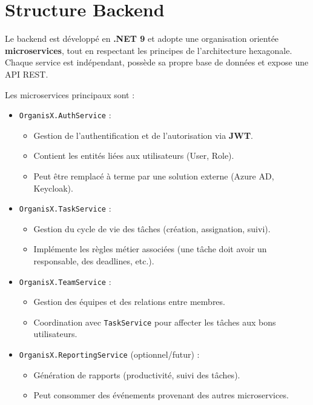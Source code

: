 \newpage
\section{Structure Backend}
Le backend est développé en \textbf{.NET 9} et adopte une organisation orientée \textbf{microservices}, tout en respectant les principes de l’architecture hexagonale.  
Chaque service est indépendant, possède sa propre base de données et expose une API REST.  

Les microservices principaux sont :  
\begin{itemize}
	\item \texttt{OrganisX.AuthService} :
	\begin{itemize}
		\item Gestion de l’authentification et de l’autorisation via \textbf{JWT}.
		\item Contient les entités liées aux utilisateurs (User, Role).
		\item Peut être remplacé à terme par une solution externe (Azure AD, Keycloak).
	\end{itemize}
	
	\item \texttt{OrganisX.TaskService} :
	\begin{itemize}
		\item Gestion du cycle de vie des tâches (création, assignation, suivi).
		\item Implémente les règles métier associées (une tâche doit avoir un responsable, des deadlines, etc.).
	\end{itemize}
	
	\item \texttt{OrganisX.TeamService} :
	\begin{itemize}
		\item Gestion des équipes et des relations entre membres.
		\item Coordination avec \texttt{TaskService} pour affecter les tâches aux bons utilisateurs.
	\end{itemize}
	
	\item \texttt{OrganisX.ReportingService} (optionnel/futur) :
	\begin{itemize}
		\item Génération de rapports (productivité, suivi des tâches).
		\item Peut consommer des événements provenant des autres microservices.
	\end{itemize}
\end{itemize}

